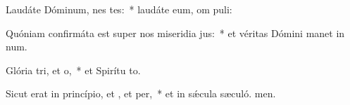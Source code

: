 \item Laudáte Dóminum, nes tes:~* laudáte eum, om puli:
\item Quóniam confirmáta est super nos miseridia jus:~* et véritas Dómini manet in num.
\item Glória tri, et o,~* et Spirítu to.
\item Sicut erat in princípio, et , et per,~* et in sǽcula sæculó. men.

